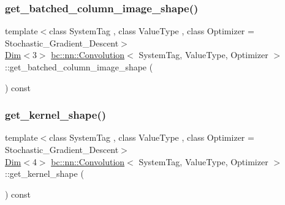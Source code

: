 \subsubsection{\texorpdfstring{get\+\_\+batched\+\_\+column\+\_\+image\+\_\+shape()}{get\_batched\_column\_image\_shape()}}
{\footnotesize\ttfamily template$<$class System\+Tag , class Value\+Type , class Optimizer  = Stochastic\+\_\+\+Gradient\+\_\+\+Descent$>$ \\
\hyperlink{structbc_1_1Dim}{Dim}$<$3$>$ \hyperlink{structbc_1_1nn_1_1Convolution}{bc\+::nn\+::\+Convolution}$<$ System\+Tag, Value\+Type, Optimizer $>$\+::get\+\_\+batched\+\_\+column\+\_\+image\+\_\+shape (\begin{DoxyParamCaption}{ }\end{DoxyParamCaption}) const\hspace{0.3cm}{\ttfamily [inline]}}

\mbox{\label{structbc_1_1nn_1_1Convolution_a881a726a100f7494eb190f7b24295c18}} 
\subsubsection{\texorpdfstring{get\+\_\+kernel\+\_\+shape()}{get\_kernel\_shape()}}
{\footnotesize\ttfamily template$<$class System\+Tag , class Value\+Type , class Optimizer  = Stochastic\+\_\+\+Gradient\+\_\+\+Descent$>$ \\
\hyperlink{structbc_1_1Dim}{Dim}$<$4$>$ \hyperlink{structbc_1_1nn_1_1Convolution}{bc\+::nn\+::\+Convolution}$<$ System\+Tag, Value\+Type, Optimizer $>$\+::get\+\_\+kernel\+\_\+shape (\begin{DoxyParamCaption}{ }\end{DoxyParamCaption}) const\hspace{0.3cm}{\ttfamily [inline]}}

\mbox{\label{structbc_1_1nn_1_1Convolution_ae0b5315e9e47fe132ac6873fcc74bcb7}} 
